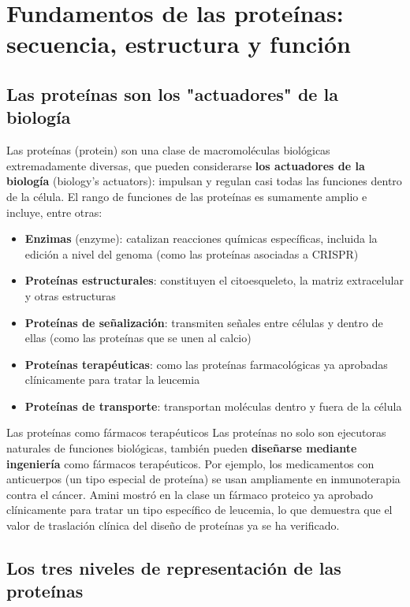 \section{Fundamentos de las proteínas: secuencia, estructura y función}

\subsection{Las proteínas son los "actuadores" de la biología}

Las proteínas (protein) son una clase de macromoléculas biológicas extremadamente diversas, que pueden considerarse \textbf{los actuadores de la biología} (biology's actuators): impulsan y regulan casi todas las funciones dentro de la célula. El rango de funciones de las proteínas es sumamente amplio e incluye, entre otras:

\begin{itemize}
    \item \textbf{Enzimas} (enzyme): catalizan reacciones químicas específicas, incluida la edición a nivel del genoma (como las proteínas asociadas a CRISPR)
    \item \textbf{Proteínas estructurales}: constituyen el citoesqueleto, la matriz extracelular y otras estructuras
    \item \textbf{Proteínas de señalización}: transmiten señales entre células y dentro de ellas (como las proteínas que se unen al calcio)
    \item \textbf{Proteínas terapéuticas}: como las proteínas farmacológicas ya aprobadas clínicamente para tratar la leucemia
    \item \textbf{Proteínas de transporte}: transportan moléculas dentro y fuera de la célula
\end{itemize}

\begin{knowledgebox}{Las proteínas como fármacos terapéuticos}
Las proteínas no solo son ejecutoras naturales de funciones biológicas, también pueden \textbf{diseñarse mediante ingeniería} como fármacos terapéuticos. Por ejemplo, los medicamentos con anticuerpos (un tipo especial de proteína) se usan ampliamente en inmunoterapia contra el cáncer. Amini mostró en la clase un fármaco proteico ya aprobado clínicamente para tratar un tipo específico de leucemia, lo que demuestra que el valor de traslación clínica del diseño de proteínas ya se ha verificado.
\end{knowledgebox}

\subsection{Los tres niveles de representación de las proteínas}

